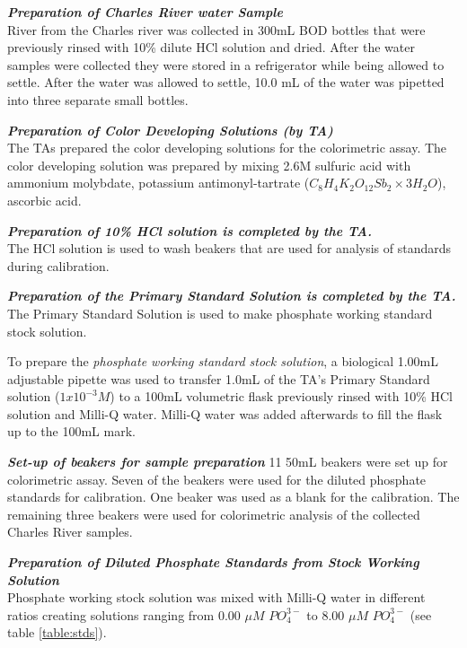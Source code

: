 \emph{\textbf{Preparation of Charles River water Sample}}\\
River from the Charles river was collected in 300mL BOD bottles that were previously rinsed with 10\% dilute HCl solution and dried. After the water samples were collected they were stored in a refrigerator while being allowed to settle. After the water was allowed to settle, 10.0 mL of the water was pipetted into three separate small bottles.

\emph{\textbf{Preparation of Color Developing Solutions (by TA)}} \\
The TAs prepared the color developing solutions for the colorimetric assay. The color developing solution was prepared by mixing 2.6M sulfuric acid with ammonium molybdate, potassium antimonyl-tartrate ($C_8H_4K_2O_{12}Sb_2 \times 3 H_2O$), ascorbic acid. 

\emph{\textbf{Preparation of 10\% HCl solution is completed by the TA.}}\\
The HCl solution is used to wash beakers that are used for analysis of standards during calibration. 

\emph{\textbf{Preparation of the Primary Standard Solution is completed by the TA.}}\\
The Primary Standard Solution is used to make phosphate working standard stock solution.

To prepare the \emph{phosphate working standard stock solution}, a biological 1.00mL adjustable pipette was used to transfer 1.0mL of the TA's Primary Standard solution ($1x10^{-3}M$) to a 100mL volumetric flask previously rinsed with 10\% HCl solution and Milli-Q water. Milli-Q water was added afterwards to fill the flask up to the 100mL mark.

\emph{\textbf{Set-up of beakers for sample preparation}}
11 50mL beakers were set up for colorimetric assay. Seven of the beakers were used for the diluted phosphate standards for calibration. One beaker was used as a blank for the calibration. The remaining three beakers were used for colorimetric analysis of the collected Charles River samples.

\emph{\textbf{Preparation of Diluted Phosphate Standards from Stock Working Solution}}\\
Phosphate working stock solution was mixed with Milli-Q water in different ratios creating solutions ranging from 0.00 $\mu M$ $PO_4^{3-}$ to 8.00 $\mu M$ $PO_4^{3-}$ (see table \ref{table:stds}).


